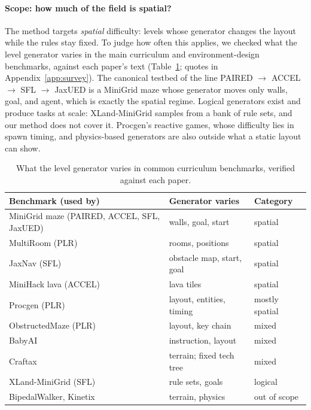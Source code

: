 \documentclass[twoside]{article}
\begin{document}
\paragraph{Scope: how much of the field is spatial?}
\label{sec:results-scope}
\label{sec:results-cross}
The method targets \emph{spatial} difficulty: levels whose generator changes the layout while the rules stay fixed. To judge how often this applies, we checked what the level generator varies in the main curriculum and environment-design benchmarks, against each paper's text (Table~\ref{tab:survey}; quotes in Appendix~\ref{app:survey}). The canonical testbed of the line PAIRED $\to$ ACCEL $\to$ SFL $\to$ JaxUED is a MiniGrid maze whose generator moves only walls, goal, and agent, which is exactly the spatial regime. Logical generators exist and produce tasks at scale: XLand-MiniGrid samples from a bank of rule sets, and our method does not cover it. Procgen's reactive games, whose difficulty lies in spawn timing, and physics-based generators are also outside what a static layout can show.

\begin{table}[t]
\centering
\small
\caption{What the level generator varies in common curriculum benchmarks, verified against each paper.}
\label{tab:survey}
\setlength{\tabcolsep}{3pt}
\begin{tabular}{p{2.9cm}p{2.7cm}l}
\toprule
Benchmark (used by) & Generator varies & Category \\
\midrule
MiniGrid maze (PAIRED, ACCEL, SFL, JaxUED) & walls, goal, start & spatial \\
MultiRoom (PLR) & rooms, positions & spatial \\
JaxNav (SFL) & obstacle map, start, goal & spatial \\
MiniHack lava (ACCEL) & lava tiles & spatial \\
Procgen (PLR) & layout, entities, timing & mostly spatial \\
ObstructedMaze (PLR) & layout, key chain & mixed \\
BabyAI & instruction, layout & mixed \\
Craftax & terrain; fixed tech tree & mixed \\
XLand-MiniGrid (SFL) & rule sets, goals & logical \\
BipedalWalker, Kinetix & terrain, physics & out of scope \\
\bottomrule
\end{tabular}
\end{table}
\end{document}
